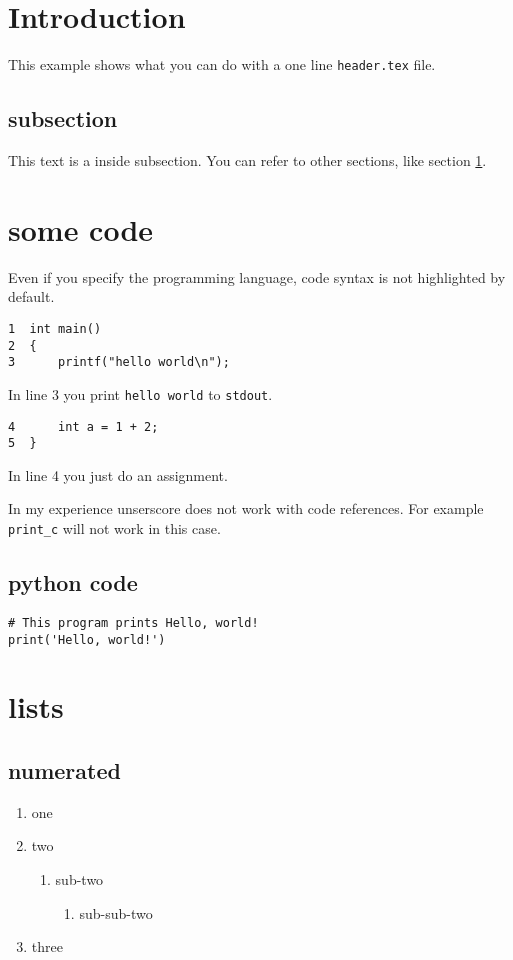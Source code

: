 


\section{Introduction}
\label{sec:orga567768}
This example shows what you can do with a one line \texttt{header.tex} file.

\subsection{subsection}
\label{sec:org2e622ce}
This text is a inside subsection. You can refer to other sections, like section \ref{sec:orga567768}.

\section{some code}
\label{sec:org01b6d82}
Even if you specify the programming language, code syntax is not highlighted
by default.

\begin{verbatim}
1  int main()
2  {
3      printf("hello world\n");
\end{verbatim}

In line 3 you print \texttt{hello world} to \texttt{stdout}.
\begin{verbatim}
4      int a = 1 + 2;
5  }
\end{verbatim}

In line 4 you just do an assignment.

In my experience unserscore does not work with code references. For example
\texttt{print\_c} will not work in this case.

\subsection{python code}
\label{sec:org3c9aff3}
\begin{verbatim}
# This program prints Hello, world!
print('Hello, world!')
\end{verbatim}

\section{lists}
\label{sec:org1c0ef1f}
\subsection{numerated}
\label{sec:org0dfb952}
\begin{enumerate}
\item one
\item two
\begin{enumerate}
\item sub-two
\begin{enumerate}
\item sub-sub-two
\end{enumerate}
\end{enumerate}
\item three
\end{enumerate}


